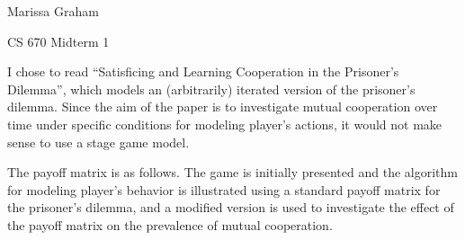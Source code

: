 \documentclass[11pt]{article}
\begin{document}
\begin{flushright}
Marissa Graham

CS 670 Midterm 1
\end{flushright}



I chose to read ``Satisficing and Learning Cooperation in the Prisoner's Dilemma'', which models an (arbitrarily) iterated version of the prisoner's dilemma. Since the aim of the paper is to investigate mutual cooperation over time under specific conditions for modeling player's actions, it would not make sense to use a stage game model. 

The payoff matrix is as follows. The game is initially presented and the algorithm for modeling player's behavior is illustrated using a standard payoff matrix for the prisoner's dilemma, and a modified version is used to investigate the effect of the payoff matrix on the prevalence of mutual cooperation.



\end{document}
